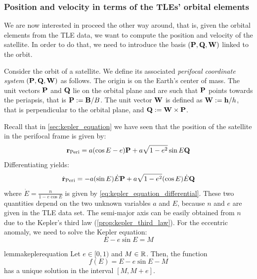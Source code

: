 \documentclass[../main.tex]{subfiles}
\begin{document}
\subsubsection{Position and velocity in terms of the TLEs' orbital elements}
We are now interested in proceed the other way around, that is, given the orbital elements from the TLE data, we want to compute the position and velocity of the satellite. In order to do that, we need to introduce the basis $(\boldsymbol{\mathrm{P}}, \boldsymbol{\mathrm{Q}}, \boldsymbol{\mathrm{W}})$ linked to the orbit.
\begin{definition}\label{def:perifocal_coordinate_system}
  Consider the orbit of a satellite. We define its associated \emph{perifocal coordinate system} $(\boldsymbol{\mathrm{P}},\boldsymbol{\mathrm{Q}},\boldsymbol{\mathrm{W}})$ as follows. The origin is on the Earth's center of mass. The unit vectors $\boldsymbol{\mathrm{P}}$ and $\boldsymbol{\mathrm{Q}}$ lie on the orbital plane and are such that $\boldsymbol{\mathrm{P}}$ points towards the periapsis, that is $\boldsymbol{\mathrm{P}}:=\boldsymbol{\mathrm{B}}/B$. The unit vector $\boldsymbol{\mathrm{W}}$ is defined as $\boldsymbol{\mathrm{W}}:=\boldsymbol{\mathrm{h}}/h$, that is perpendicular to the orbital plane, and $\boldsymbol{\mathrm{Q}}:=\boldsymbol{\mathrm{W}}\times\boldsymbol{\mathrm{P}}$.
\end{definition}
Recall that in \cref{sec:kepler_equation} we have seen that the position of the satellite in the perifocal frame is given by:
\begin{equation}
  \boldsymbol{\mathrm{r}}_\mathrm{Peri} = a(\cos E-e)\boldsymbol{\mathrm{P}} + a\sqrt{1-e^2}\sin E\boldsymbol{\mathrm{Q}}
\end{equation}
Differentiating yields:
\begin{equation}
  \dot{\boldsymbol{\mathrm{r}}}_\mathrm{Peri} = - a (\sin E)\dot{E}\boldsymbol{\mathrm{P}}+a\sqrt{1-e^2}(\cos E)\dot{E}\boldsymbol{\mathrm{Q}}
\end{equation}
where $\dot{E}=\frac{n}{1-e\cos E}$ is given by \cref{eq:kepler_equation_differential}. These two quantities depend on the two unknown variables $a$ and $E$, because $n$ and $e$ are given in the TLE data set. The semi-major axis can be easily obtained from $n$ due to the Kepler's third law (\cref{prop:kepler_third_law}). For the eccentric anomaly, we need to solve the Kepler equation:
\begin{equation}
  E-e\sin E = M
\end{equation}
\begin{restatable}{lemma}{keplerequation}\label{lemma:kepler_equation}
  Let $e\in[0,1)$ and $M\in\mathbb{R}$. Then, the function
  \begin{equation}
    f(E) = E-e\sin E - M
  \end{equation}
  has a unique solution in the interval $[M, M+e]$.
\end{restatable}
\end{document}
